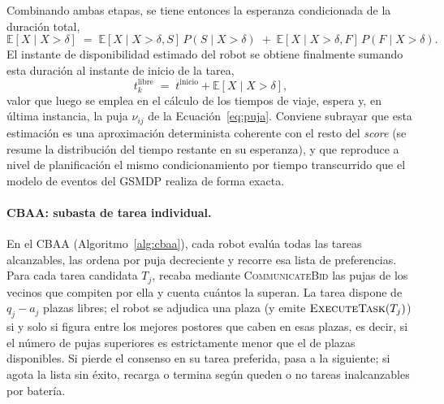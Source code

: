 Combinando ambas etapas, se tiene entonces la esperanza condicionada de la duración total,
\begin{equation} \label{eq:cond-exp}
    \mathbb{E}[X\mid X>\delta] \;=\; \mathbb{E}[X\mid X>\delta, S] \, P(S \mid X>\delta) \;+\; \mathbb{E}[X\mid X>\delta, F] \, P(F\mid X>\delta).
\end{equation}
El instante de disponibilidad estimado del robot se obtiene finalmente sumando esta duración al instante de inicio de la tarea,
\begin{equation} \label{eq:freetime}
    t_k^{\mathrm{libre}} \;=\; t^{\mathrm{inicio}} + \mathbb{E}[X\mid X>\delta],
\end{equation}
valor que luego se emplea en el cálculo de los tiempos de viaje, espera y, en última instancia, la puja $\nu_{ij}$ de la Ecuación~\eqref{eq:puja}. Conviene subrayar que esta estimación es una aproximación determinista coherente con el resto del \textit{score} (se resume la distribución del tiempo restante en su esperanza), y que reproduce a nivel de planificación el mismo condicionamiento por tiempo transcurrido que el modelo de eventos del GSMDP realiza de forma exacta.

\paragraph{CBAA: subasta de tarea individual.} En el CBAA (Algoritmo~\ref{alg:cbaa}), cada robot evalúa todas las tareas alcanzables, las ordena por puja decreciente y recorre esa lista de preferencias. Para cada tarea candidata $T_j$, recaba mediante \textsc{CommunicateBid} las pujas de los vecinos que compiten por ella y cuenta cuántos la superan. La tarea dispone de $q_j-a_j$ plazas libres; el robot se adjudica una plaza (y emite $\textsc{ExecuteTask}(T_j)$) si y solo si figura entre los mejores postores que caben en esas plazas, es decir, si el número de pujas superiores es estrictamente menor que el de plazas disponibles. Si pierde el consenso en su tarea preferida, pasa a la siguiente; si agota la lista sin éxito, recarga o termina según queden o no tareas inalcanzables por batería.

